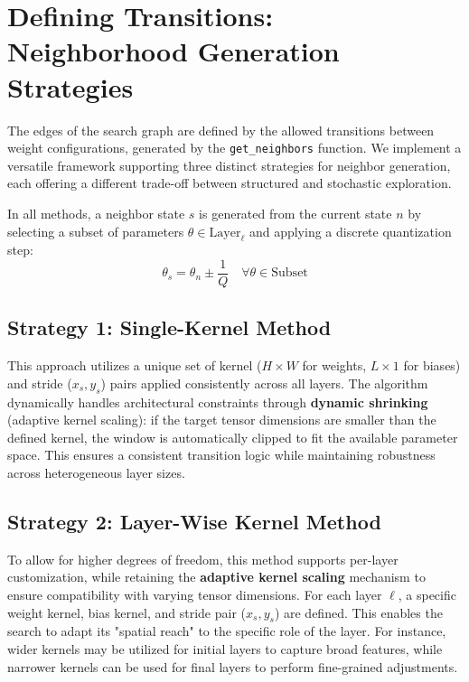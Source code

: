 
\section{Defining Transitions: Neighborhood Generation Strategies}

The edges of the search graph are defined by the allowed transitions between weight configurations, generated by the \texttt{get\_neighbors} function. We implement a versatile framework supporting three distinct strategies for neighbor generation, each offering a different trade-off between structured and stochastic exploration.

In all methods, a neighbor state $s$ is generated from the current state $n$ by selecting a subset of parameters $\theta \in \text{Layer}_{\ell}$ and applying a discrete quantization step:
$$ \theta_{s} = \theta_{n} \pm \frac{1}{Q} \quad \forall \theta \in \text{Subset} $$

\subsection{Strategy 1: Single-Kernel Method}
This approach utilizes a unique set of kernel ($H \times W$ for weights, $L \times 1$ for biases) and stride ($x_s, y_s$) pairs applied consistently across all layers. The algorithm dynamically handles architectural constraints through \textbf{dynamic shrinking} (adaptive kernel scaling): if the target tensor dimensions are smaller than the defined kernel, the window is automatically clipped to fit the available parameter space. This ensures a consistent transition logic while maintaining robustness across heterogeneous layer sizes.

\subsection{Strategy 2: Layer-Wise Kernel Method}
To allow for higher degrees of freedom, this method supports per-layer customization, while retaining the \textbf{adaptive kernel scaling} mechanism to ensure compatibility with varying tensor dimensions. For each layer $\ell$, a specific weight kernel, bias kernel, and stride pair ($x_s, y_s$) are defined. This enables the search to adapt its "spatial reach" to the specific role of the layer. For instance, wider kernels may be utilized for initial layers to capture broad features, while narrower kernels can be used for final layers to perform fine-grained adjustments.

